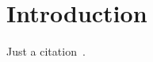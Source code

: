\section{Introduction}
\label{sec:intro}

Just a citation~\cite{Enck:Gilbert:Chun:Cox:Jung:McDaniel:Sheth:OSDI10}.